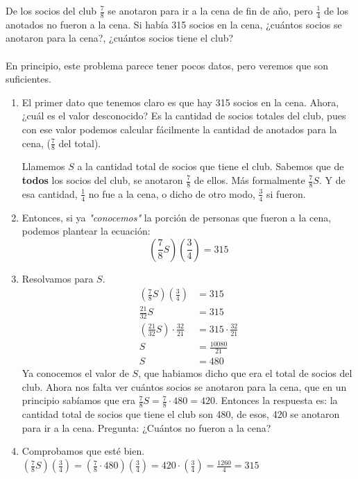\documentclass{article}
\begin{document}
\begin{ejemplo}
De los socios del club $\frac{7}{8}$ se anotaron para ir a la cena de fin de año, pero $\frac{1}{4}$ de los anotados no fueron a la cena. Si había 315 socios en la cena, ¿cuántos socios se anotaron para la cena?, ¿cuántos socios tiene el club?
\\ \\
En principio, este problema parece tener pocos datos, pero veremos que son suficientes.
\begin{enumerate}
	\item El primer dato que tenemos claro es que hay 315 socios en la cena. Ahora, ¿cuál es el valor desconocido? Es la cantidad de socios totales del club, pues con ese valor podemos calcular fácilmente la cantidad de anotados para la cena, ($\frac{7}{8}$ del total).
	
Llamemos $S$ a la cantidad total de socios que tiene el club. Sabemos que de \textbf{todos} los socios del club, se anotaron $\frac{7}{8}$ de ellos. Más formalmente $\frac{7}{8}S$. Y de esa cantidad, $\frac{1}{4}$ no fue a la cena, o dicho de otro modo, $\frac{3}{4}$ si fueron.

	\item Entonces, si ya \textit{"conocemos"} la porción de personas que fueron a la cena, podemos plantear la ecuación:
	\[(\frac{7}{8}S)(\frac{3}{4})=315\]
	\item Resolvamos para $S$.
	\begin{align}
	(\frac{7}{8}S)(\frac{3}{4})&=315\nonumber\\
	\frac{21}{32}S&=315\nonumber\\
	(\frac{21}{32}S)\cdot\frac{32}{21}&=315\cdot\frac{32}{21}\nonumber\\
	S&=\frac{10080}{21}\nonumber\\
	S&=480\nonumber
	\end{align}
	Ya conocemos el valor de $S$, que habiamos dicho que era el total de socios del club. Ahora nos falta ver cuántos socios se anotaron para la cena, que en un principio sabíamos que era $\frac{7}{8}S=\frac{7}{8}\cdot480=420$. Entonces la respuesta es: la cantidad total de socios que tiene el club son 480, de esos, 420 se anotaron para ir a la cena. Pregunta: ¿Cuántos no fueron a la cena?
	\item Comprobamos que esté bien. $(\frac{7}{8}S)(\frac{3}{4})=(\frac{7}{8}\cdot480)(\frac{3}{4})=420\cdot(\frac{3}{4})=\frac{1260}{4}=315$
\end{enumerate}

\end{ejemplo}
\end{document}
